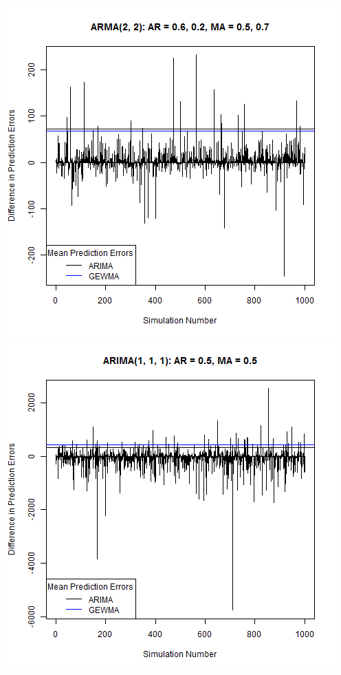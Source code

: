 \documentclass[12pt]{article}
\begin{document}
\begin{center}
\includegraphics[scale=.5]{plot_5.png}\\
\includegraphics[scale=.5]{plot_6.png}\\
\end{center}

\newpage
\end{document}
